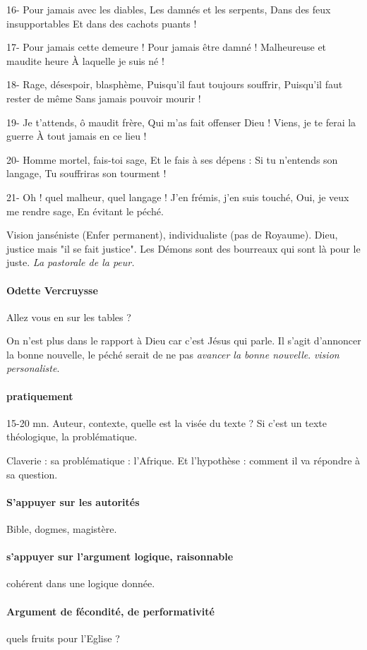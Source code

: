 \begin{singlequote}
16- Pour jamais avec les diables,
Les damnés et les serpents,
Dans des feux insupportables
Et dans des cachots puants !

17- Pour jamais cette demeure !
Pour jamais être damné !
Malheureuse et maudite heure
À laquelle je suis né !

18- Rage, désespoir, blasphème,
Puisqu’il faut toujours souffrir,
Puisqu’il faut rester de même
Sans jamais pouvoir mourir !

19- Je t’attends, ô maudit frère,
Qui m’as fait offenser Dieu !
Viens, je te ferai la guerre
À tout jamais en ce lieu !

20- Homme mortel, fais-toi sage,
Et le fais à ses dépens :
Si tu n’entends son langage,
Tu souffriras son tourment !

21- Oh ! quel malheur, quel langage !
J’en frémis, j’en suis touché,
Oui, je veux me rendre sage,
En évitant le péché.

\end{singlequote}
Vision janséniste (Enfer permanent), individualiste (pas de Royaume). Dieu, justice mais "il se fait justice". Les Démons sont des bourreaux qui sont là pour le juste. \textit{La pastorale de la peur.}


\paragraph{Odette Vercruysse} 
\begin{singlequote}
    Allez vous en sur les tables ?
\end{singlequote}
On n'est plus dans le rapport à Dieu car c'est Jésus qui parle. Il s'agit d'annoncer la bonne nouvelle, le péché serait de ne pas \textit{avancer la bonne nouvelle}. \textit{vision personaliste}. 


\paragraph{pratiquement} 15-20 mn. Auteur, contexte, quelle est la visée du texte ? Si c'est un texte théologique, la problématique. 

\begin{Ex}
    Claverie : sa problématique : l'Afrique.
    Et l'hypothèse : comment il va répondre à sa question. 
\end{Ex}

\paragraph{S'appuyer sur les autorités} Bible, dogmes, magistère.
\paragraph{s'appuyer sur l'argument logique, raisonnable} cohérent dans une logique donnée. 
\paragraph{Argument de fécondité, de performativité} quels fruits pour l'Eglise ? 



